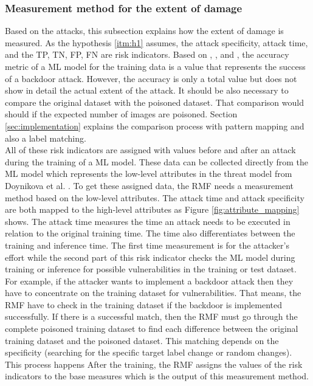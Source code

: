 \subsubsection*{Measurement method for the extent of damage}
\label{sec:ext_dmg}

Based on the attacks, this subsection explains how the extent of damage is measured. As the hypothesis \ref{itm:h1} assumes, the attack specificity, attack time, and the TP, TN, FP, FN are risk indicators. Based on \cite{DBLP:journals/corr/abs-1708-06733}, \cite{turner2018clean}, and \cite{DBLP:journals/corr/abs-1910-00033}, the accuracy metric of a ML model for the training data is a value that represents the success of a backdoor attack. However, the accuracy is only a total value but does not show in detail the actual extent of the attack. It should be also necessary to compare the original dataset with the poisoned dataset. That comparison would should if the expected number of images are poisoned. Section \ref{sec:implementation} explains the comparison process with pattern mapping and also a label matching. \\
All of these risk indicators are assigned with values before and after an attack during the training of a ML model. These data can be collected directly from the ML model which represents the low-level attributes in the threat model from Doynikova et al. \cite{DBLP:conf/crisis/DoynikovaNGK20}. To get these assigned data, the RMF needs a measurement method based on the low-level attributes. The attack time and attack specificity are both mapped to the high-level attributes as Figure \ref{fig:attribute_mapping} shows. The attack time measures the time an attack needs to be executed in relation to the original training time. The time also differentiates between the training and inference time. The first time measurement is for the attacker's effort while the second part of this risk indicator checks the ML model during training or inference for possible vulnerabilities \cite{DBLP:journals/csur/RosenbergSER21} in the training or test dataset. For example, if the attacker wants to implement a backdoor attack then they have to concentrate on the training dataset for vulnerabilities. That means, the RMF have to check in the training dataset if the backdoor is implemented successfully. If there is a successful match, then the RMF must go through the complete poisoned training dataset to find each difference between the original training dataset and the poisoned dataset. This matching depends on the specificity (searching for the specific target label change or random changes). This process happens After the training, the RMF assigns the values of the risk indicators to the base measures which is the output of this measurement method.

